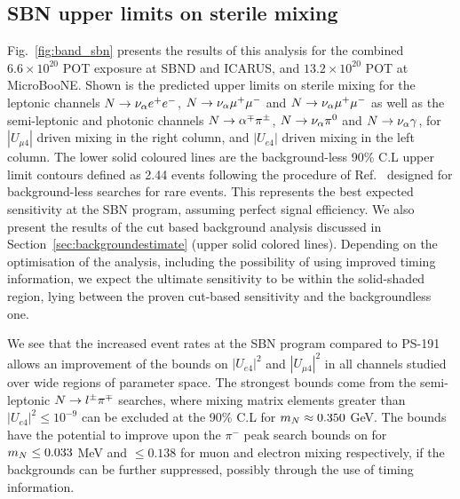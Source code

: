 \documentclass[11pt, a4paper]{article}
\newcommand{\reffig}[1]{Fig.~\ref{#1}}
\newcommand{\refsec}[1]{Section~\ref{#1}}
\newcommand{\refref}[1]{Ref.~\cite{#1}}
\def\muboone{MicroBooNE}
\def\ster{\ensuremath N}
\begin{document}
\subsection{SBN upper limits on sterile mixing}
%
\reffig{fig:band_sbn} presents the results of this analysis for the combined
$6.6\times 10^{20}$ POT exposure at SBND and ICARUS, and $13.2\times10^{20}$
POT at \muboone. Shown is the predicted upper limits on sterile mixing for the
leptonic channels $\ster \rightarrow \nu_\alpha e^+e^-$, $\ster \rightarrow
\nu_\alpha \mu^+ \mu^- $ and $\ster \rightarrow \nu_\alpha \mu^+ \mu^- $ as
well as the semi-leptonic and photonic channels $\ster \rightarrow \alpha^\mp
\pi^\pm$,  $\ster \rightarrow \nu_\alpha \pi^0$ and $\ster \rightarrow
\nu_\alpha \gamma$, for $|U_{\mu 4}|$ driven mixing in the right column, and
$|U_{e4}|$ driven mixing  in the left column.  The lower solid coloured lines
are the background-less 90\% C.L upper limit contours defined as 2.44 events
following the procedure of \refref{Feldman:1997qc} designed for background-less
searches for rare events. This represents the best expected sensitivity at the
SBN program, assuming perfect signal efficiency.  We also present the results
of the cut based background analysis discussed in
\refsec{sec:backgroundestimate} (upper solid colored lines).  
%
Depending on the optimisation of the analysis, including the possibility of
using improved timing information, we expect the ultimate sensitivity to be
within the solid-shaded region, lying between the proven cut-based sensitivity
and the backgroundless one.

We see that the increased event rates at the SBN program compared to PS-191
allows an improvement of the bounds on $|U_{e4}|^2$ and $|U_{\mu 4}|^2$ in all
channels studied over wide regions of parameter space. The strongest bounds
come from the semi-leptonic $\ster \rightarrow l^\pm \pi^\mp$ searches, where
mixing matrix elements greater than $|U_{e4}|^2 \leq 10^{-9}$ can be excluded
at the 90\% C.L for $m_\ster \approx 0.350$ GeV. The bounds have the potential
to improve upon the $\pi^-$ peak search bounds on for $m_\ster \leq 0.033$ MeV
and $\leq 0.138$ for muon and electron mixing respectively, if the backgrounds
can be further suppressed, possibly through the use of timing information.
\end{document}
